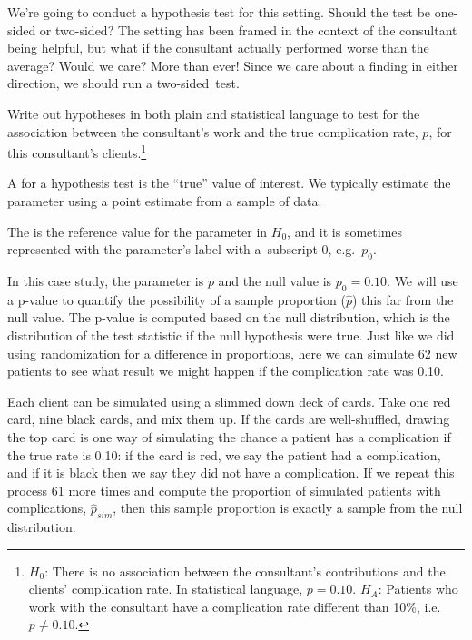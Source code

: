 \begin{example}{We're going to conduct a hypothesis test for this setting. Should the test be one-sided or two-sided?}
The setting has been framed in the context of the consultant being helpful, but what if the consultant actually performed worse than the average? Would we care? More than ever! Since we care about a finding in either direction, we should run a two-sided~test.
\end{example}

\begin{exercise}\label{hypForAssessingConsultantWorkInLiverTransplants}
Write out hypotheses in both plain and statistical language to test for the association between the consultant's work and the true complication rate, $p$, for this consultant's clients.\footnote{$H_0$: There is no association between the consultant's contributions and the clients' complication rate. In statistical language, $p=0.10$. $H_A$: Patients who work with the consultant have a complication rate different than 10\%, i.e. $p \neq 0.10$.}
\end{exercise}

\begin{termBox}{
A  for a hypothesis test is the ``true'' value of interest. We typically estimate the parameter using a point estimate from a sample of data.}
\end{termBox}

\begin{termBox}{
The  is the reference value for the parameter in $H_0$, and it is sometimes represented with the parameter's label with a~subscript 0, e.g.~$p_0$.}
\end{termBox}

In this case study, the parameter is $p$ and the null value is $p_0 = 0.10$. We will use a p-value to quantify the possibility of a sample proportion ($\hat{p}$) this far from the null value. The p-value is computed based on the null distribution, which is the distribution of the test statistic if the null hypothesis were true. Just like we did using randomization for a difference in proportions, here we can simulate 62 new patients to see what result we might happen if the complication rate was 0.10.

Each client can be simulated using a slimmed down deck of cards. Take one red card, nine black cards, and mix them up. If the cards are well-shuffled, drawing the top card is one way of simulating the chance a patient has a complication if the true rate is 0.10: if the card is red, we say the patient had a complication, and if it is black then we say they did not have a complication. If we repeat this process 61 more times and compute the proportion of simulated patients with complications, $\hat{p}_{sim}$, then this sample proportion is exactly a sample from the null distribution.

